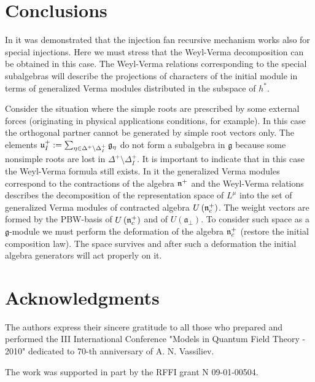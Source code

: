 \documentclass[12pt]{article}
\theoremstyle{definition}
\newcommand{\gf}{\mathfrak{g}}
\newcommand{\afb}{\mathfrak{a}_{\bot}}
\begin{document}
\section{Conclusions}

\label{sec:conclusions}


In \cite{2010arXiv1007.0318L} it was demonstrated that the injection fan recursive mechanism
works also for special injections. Here we must stress that the Weyl-Verma decomposition
can be obtained in this case. The Weyl-Verma relations corresponding to the special
subalgebras will describe the projections of characters of the initial module in terms
of generalized Verma modules distributed in the subspace of $h^*$.


Consider the situation where the simple roots are prescribed by some external
forces (originating in physical applications conditions, for example). In this case
the orthogonal partner cannot be generated by simple root vectors only.  The elements
$\frak{u}_{I}^{+}:=\sum_{\eta \in \Delta ^{+}\setminus \Delta _{I}^{+}}\gf%
_{\eta }$ do not form a subalgebra in $\gf$ because some nonsimple roots are lost in
$\Delta ^{+}\setminus \Delta _{I}^{+}$. It is important to indicate that in this case
the Weyl-Verma formula still exists. In it the generalized Verma modules correspond to
the contractions \cite{Doebner1967Melsheimer} of the algebra $\frak{n}^{+}$ and the
Weyl-Verma relations describes the decomposition of the representation space of $L^{\mu}$
into the set of generalized Verma modules of contracted algebra
$U\left(\frak{n}_c^{+}\right)$. The weight vectors are formed by the PBW-basis
of $U\left(\frak{n}_c^{+}\right)$ and of $U\left( \afb \right)$. To consider such space
as a $\gf$-module we must perform the deformation \cite{Nijenhuis1966Richardson} of
the algebra $\frak{n}_c^{+}$ (restore the initial composition law). The space survives
and after such a deformation the initial
algebra generators will act properly on it.



\section{Acknowledgments}
The authors express their sincere gratitude to all those who prepared and performed the
III International Conference "Models in Quantum Field Theory - 2010" dedicated to 70-th
anniversary of A. N. Vassiliev.

The work was supported in part by the RFFI grant N 09-01-00504.

%
%
%
%
%





{}
\end{document}
